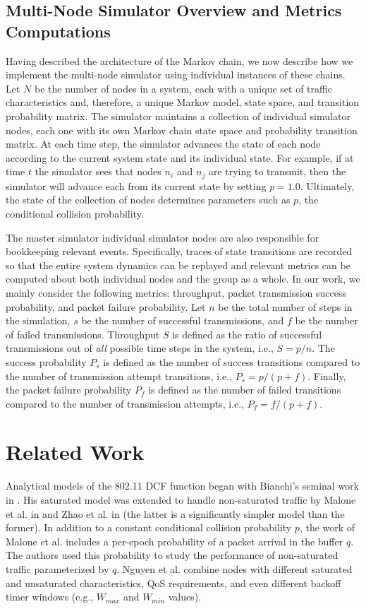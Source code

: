 \documentclass[conference]{IEEEtran}
\begin{document}
\subsection{Multi-Node Simulator Overview and Metrics Computations}

Having described the architecture of the Markov chain, we now describe how we implement the multi-node simulator using individual instances of these chains. Let $N$ be the number of nodes in a system, each with a unique set of traffic characteristics and, therefore, a unique Markov model, state space, and transition probability matrix. The simulator maintains a collection of individual simulator nodes, each one with its own Markov chain state space and probability transition matrix. At each time step, the simulator advances the state of each node according to the current system state and its individual state. For example, if at time $t$ the simulator sees that nodes $n_i$ and $n_j$ are trying to transmit, then the simulator will advance each from its current state by setting $p = 1.0$. Ultimately, the state of the collection of nodes determines parameters such as $p$, the conditional collision probability. 

The master simulator individual simulator nodes are also responsible for bookkeeping relevant events. Specifically, traces of state transitions are recorded so that the entire system dynamics can be replayed and relevant metrics can be computed about both individual nodes and the group as a whole. In our work, we mainly consider the following metrics: throughput, packet transmission success probability, and packet failure probability. Let $n$ be the total number of steps in the simulation, $s$ be the number of successful transmissions, and $f$ be the number of failed transmissions. Throughput $S$ is defined as the ratio of successful transmissions out of \emph{all} possible time steps in the system, i.e., $S = p / n$. The success probability $P_s$ is defined as the number of success transitions compared to the number of transmission attempt transitions, i.e., $P_s = p / (p + f)$. Finally, the packet failure probability $P_f$ is defined as the number of failed transitions compared to the number of transmission attempts, i.e., $P_f = f / (p + f)$. 

\section{Related Work}
Analytical models of the 802.11 DCF function began with Bianchi's seminal work in \cite{bianchi1996performance}. His saturated model was extended to handle non-saturated traffic by Malone et al. in \cite{dcf-nonsaturated} and Zhao et al. in \cite{zhao2009simple} (the latter is a significantly simpler model than the former). In addition to a constant conditional collision probability $p$, the work of Malone et al. includes a per-epoch probability of a packet arrival in the buffer $q$. The authors used this probability to study the performance of non-saturated traffic parameterized by $q$. Nguyen et al. \cite{nguyen2012performance} combine nodes with different saturated and unsaturated characteristics, QoS requirements, and even different backoff timer windows (e.g., $W_{max}$ and $W_{min}$ values). 
\end{document}

